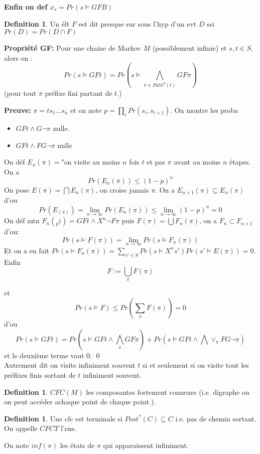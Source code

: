 \documentclass[12pt]{article}
\theoremstyle{plain}
\theoremstyle{definition}
\newtheorem{defn}[subsubsection]{Definition}
\theoremstyle{remark}
\begin{document}
\noindent \textbf{Enfin on def $x_s=Pr(s\vDash GFB)$}

\begin{defn}
    Un élt $F$ est dit presque sur sous l'hyp d'un evt $D$
    ssi $Pr(D)=Pr(D\cap F)$
\end{defn}

\textbf{Propriété GF:} Pour une chaine de Markov $M$
(possiblement infinie) et $s,t\in S$, alors on :
\[
    Pr(s\vDash GF t)=Pr(s\vDash \bigwedge_{\pi\in Path^F(t)} GF \pi)
\]
(pour tout $\pi$ préfixe fini partant de $t$.)

\textbf{Preuve:} $\pi=ts_1\ldots s_n$ et on note
 $p= \prod_i Pr(s_i, s_{i+1})$. On montre les proba 
\begin{itemize}
    \item $GFt\wedge G\neg \pi$ nulle.
    \item $GFt\wedge FG\neg \pi$ nulle
\end{itemize}
On déf $E_n(\pi)=$"on visite au moins $n$ fois $t$ et pas
$\pi$ avant au moins $n$ étapes. On a 
\[
    Pr(E_n(\pi))\leq (1-p)^n
\]
On pose $E(\pi)=\bigcap E_n(\pi)$, on croise jamais $\pi$.
On a $E_{n+1}(\pi)\subseteq E_{n}(\pi)$ d'ou 
\[
    Pr(E_(\pi))=\lim_{n\to \infty} 
    Pr(E_n(\pi))\leq \lim_{n\to \infty} (1-p)^n=0
\]
On déf mtn $F_n(_pi)=GFt\wedge X^n\neg F\pi$ puis 
$F(\pi)=\bigcup F_n(\pi)$, on a $F_n\subset F_{n+1}$ d'ou:
\[Pr(s\vDash F(\pi))=\lim_{n\to\infty}Pr(s\vDash F_n(\pi))\]
Et on a en fait $Pr(s\vDash F_n(\pi))=\sum_{s'\in S}
Pr(s\vDash X^n s')Pr(s'\vDash E(\pi))=0$. Enfin
\[F:=\bigcup_{\pi} F(\pi)\]

et \[Pr(s\vDash F)\leq Pr(\sum_{\pi} F(\pi))=0\]
d'ou \[Pr(s\vDash GFt)=Pr(s\vDash GFt\wedge \bigwedge_{\pi}
GF\pi)+Pr(s\vDash GFt\wedge \bigwedge \lor_{\pi} FG\neg \pi)\]
et le deuxième terme vaut 0. \qed\\
\newline
Autrement dit on visite infiniment souvent $t$ 
si et seulement si on visite tout les préfixes finis
sortant de $t$ infiniment souvent.

\begin{defn}
    $CFC(M)$ les composantes fortement connexes (i.e. digraphe
     ou on peut accéder achaque point de chaque point.).
\end{defn}
\begin{defn}
    Une cfc est terminale si $Post^*(C)\subseteq C$ i.e.
    pas de chemin sortant. On appelle $CFCT$ l'ens.
\end{defn}
On note $inf(\pi)$ les états de $\pi$ qui apparaissent 
infiniment.
\end{document}

